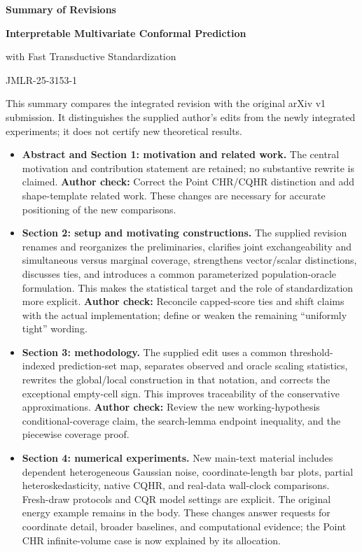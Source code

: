 \documentclass[10pt]{article}
\newcommand{\checkauthor}[1]{\textcolor{red!65!black}{\textbf{Author check:} #1}}
\begin{document}
\begin{center}
{\Large\bfseries Summary of Revisions}\par
\vspace{0.3em}
{\bfseries Interpretable Multivariate Conformal Prediction\par
with Fast Transductive Standardization}\par
JMLR-25-3153-1
\end{center}

This summary compares the integrated revision with the original arXiv v1
submission. It distinguishes the supplied author's edits from the newly
integrated experiments; it does not certify new theoretical results.

\begin{itemize}
\item \textbf{Abstract and Section 1: motivation and related work.}
The central motivation and contribution statement are retained; no substantive
rewrite is claimed. \checkauthor{Correct the Point CHR/CQHR distinction and
add shape-template related work.} These changes are necessary for accurate
positioning of the new comparisons.

\item \textbf{Section 2: setup and motivating constructions.}
The supplied revision renames and reorganizes the preliminaries, clarifies
joint exchangeability and simultaneous versus marginal coverage, strengthens
vector/scalar distinctions, discusses ties, and introduces a common
parameterized population-oracle formulation. This makes the statistical
target and the role of standardization more explicit.
\checkauthor{Reconcile capped-score ties and shift claims with the actual
implementation; define or weaken the remaining ``uniformly tight'' wording.}

\item \textbf{Section 3: methodology.}
The supplied edit uses a common threshold-indexed prediction-set map,
separates observed and oracle scaling statistics, rewrites the global/local
construction in that notation, and corrects the exceptional empty-cell sign.
This improves traceability of the conservative approximations.
\checkauthor{Review the new working-hypothesis conditional-coverage claim,
the search-lemma endpoint inequality, and the piecewise coverage proof.}

\item \textbf{Section 4: numerical experiments.}
New main-text material includes dependent heterogeneous Gaussian noise,
coordinate-length bar plots, partial heteroskedasticity, native CQHR, and
real-data wall-clock comparisons. Fresh-draw protocols and CQR model settings
are explicit. The original energy example remains in the body. These changes
answer requests for coordinate detail, broader baselines, and computational
evidence; the Point CHR infinite-volume case is now explained by its allocation.


\end{itemize}
\end{document}
